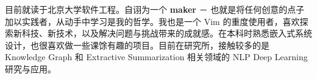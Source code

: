 

\begin{cvparagraph}

目前就读于北京大学软件工程。自诩为一个 \textbf{maker} － 也就是将任何创意的点子加以实践者，从动手中学习是我的哲学。我也是一个 Vim 的重度使用者，喜欢探索新科技、新技术，以及解决问题与挑战带来的成就感。在本科时熟悉嵌入式系统设计，也很喜欢做一些课馀有趣的项目。目前在研究所，接触较多的是 Knowledge Graph 和 Extractive Summarization 相关领域的 NLP Deep Learning 研究与应用。
\end{cvparagraph}
